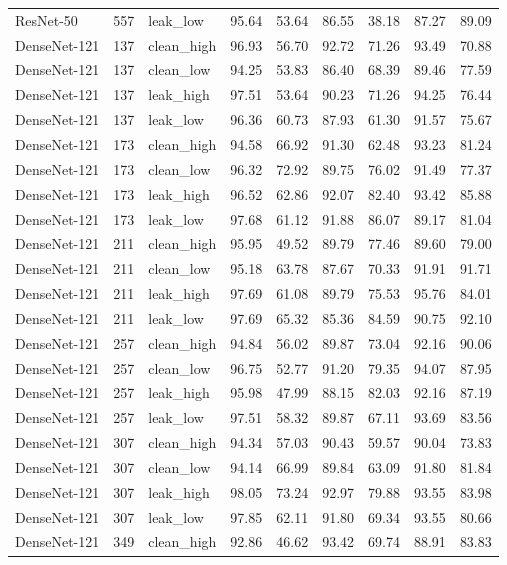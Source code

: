 {\begin{longtable}{lrlrrrrrr}
ResNet-50 & 557 & leak\_low & 95.64 & 53.64 & 86.55 & 38.18 & 87.27 & 89.09 \\
DenseNet-121 & 137 & clean\_high & 96.93 & 56.70 & 92.72 & 71.26 & 93.49 & 70.88 \\
DenseNet-121 & 137 & clean\_low & 94.25 & 53.83 & 86.40 & 68.39 & 89.46 & 77.59 \\
DenseNet-121 & 137 & leak\_high & 97.51 & 53.64 & 90.23 & 71.26 & 94.25 & 76.44 \\
DenseNet-121 & 137 & leak\_low & 96.36 & 60.73 & 87.93 & 61.30 & 91.57 & 75.67 \\
DenseNet-121 & 173 & clean\_high & 94.58 & 66.92 & 91.30 & 62.48 & 93.23 & 81.24 \\
DenseNet-121 & 173 & clean\_low & 96.32 & 72.92 & 89.75 & 76.02 & 91.49 & 77.37 \\
DenseNet-121 & 173 & leak\_high & 96.52 & 62.86 & 92.07 & 82.40 & 93.42 & 85.88 \\
DenseNet-121 & 173 & leak\_low & 97.68 & 61.12 & 91.88 & 86.07 & 89.17 & 81.04 \\
DenseNet-121 & 211 & clean\_high & 95.95 & 49.52 & 89.79 & 77.46 & 89.60 & 79.00 \\
DenseNet-121 & 211 & clean\_low & 95.18 & 63.78 & 87.67 & 70.33 & 91.91 & 91.71 \\
DenseNet-121 & 211 & leak\_high & 97.69 & 61.08 & 89.79 & 75.53 & 95.76 & 84.01 \\
DenseNet-121 & 211 & leak\_low & 97.69 & 65.32 & 85.36 & 84.59 & 90.75 & 92.10 \\
DenseNet-121 & 257 & clean\_high & 94.84 & 56.02 & 89.87 & 73.04 & 92.16 & 90.06 \\
DenseNet-121 & 257 & clean\_low & 96.75 & 52.77 & 91.20 & 79.35 & 94.07 & 87.95 \\
DenseNet-121 & 257 & leak\_high & 95.98 & 47.99 & 88.15 & 82.03 & 92.16 & 87.19 \\
DenseNet-121 & 257 & leak\_low & 97.51 & 58.32 & 89.87 & 67.11 & 93.69 & 83.56 \\
DenseNet-121 & 307 & clean\_high & 94.34 & 57.03 & 90.43 & 59.57 & 90.04 & 73.83 \\
DenseNet-121 & 307 & clean\_low & 94.14 & 66.99 & 89.84 & 63.09 & 91.80 & 81.84 \\
DenseNet-121 & 307 & leak\_high & 98.05 & 73.24 & 92.97 & 79.88 & 93.55 & 83.98 \\
DenseNet-121 & 307 & leak\_low & 97.85 & 62.11 & 91.80 & 69.34 & 93.55 & 80.66 \\
DenseNet-121 & 349 & clean\_high & 92.86 & 46.62 & 93.42 & 69.74 & 88.91 & 83.83 \\

\end{longtable}}
